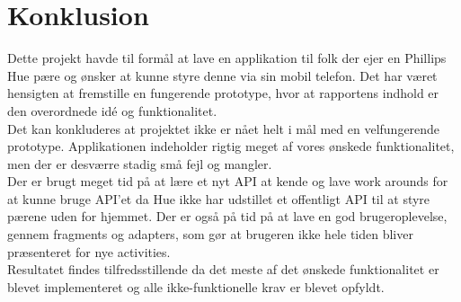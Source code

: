 \chapter{Konklusion}
Dette projekt havde til formål at lave en applikation til folk der ejer en Phillips Hue pære og ønsker at kunne styre denne via sin mobil telefon. Det har været hensigten at fremstille en fungerende prototype, hvor at rapportens indhold er den overordnede idé og funktionalitet.\\
Det kan konkluderes at projektet ikke er nået helt i mål med en velfungerende prototype. Applikationen indeholder rigtig meget af vores ønskede funktionalitet, men der er desværre stadig små fejl og mangler.\\
Der er brugt meget tid på at lære et nyt API at kende og lave work arounds for at kunne bruge API'et da Hue ikke har udstillet et offentligt API til at styre pærene uden for hjemmet. Der er også på tid på at lave en god brugeroplevelse, gennem fragments og adapters, som gør at brugeren ikke hele tiden bliver præsenteret for nye activities.\\
Resultatet findes tilfredsstillende da det meste af det ønskede funktionalitet er blevet implementeret og alle ikke-funktionelle krav er blevet opfyldt. 
